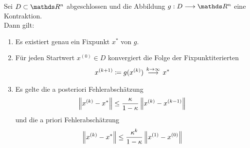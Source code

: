 \begin{Satze}
	\label{5.2.4}
	Sei $D\subset \R^n$ abgeschlossen und die Abbildung $g:D\longrightarrow \R^n$  eine Kontraktion. \\
	Dann gilt:
	\begin{enumerate}[1)]
		\item Es existiert genau ein Fixpunkt $x^{*}$ von $g$.
		\item Für jeden Startwert $x^{(0)}\in D$ konvergiert die Folge der Fixpunktiterierten
		\begin{gather}
		x^{(k+1)} \coloneqq g(x^{(k)})  ~
		\overset{\mathclap{k\rightarrow \infty}}{\longrightarrow}~ x^{*}
		\label{V.2.5}
		\end{gather}
		\item Es gelte die a posteriori Fehlerabschätzung
		\begin{gather}
		\left\| x^{(k)}-x^{*} \right\| \leq \frac{\kappa}{1-\kappa} \left\| x^{(k)}-x^{(k-1)} \right\|
		\label{V.2.6}
		\end{gather}
		und die a priori Fehlerabschätzung
		\begin{gather}
		\left\| x^{(k)}-x^{*} \right\| \leq \frac{\kappa^k}{1-\kappa} \left\| x^{(1)}-x^{(0)}  \right\|
		\label{V.2.7}
		\end{gather}
	\end{enumerate}
\end{Satze}



